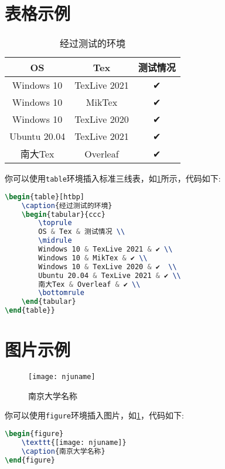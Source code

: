 \documentclass[
    TitleLength=1,%
    Degree=UG,%
    Type=thesis%
]{njuthesis}
\begin{document}
\section{表格示例}
\begin{table}[htbp]
    \caption{经过测试的环境}
    \label{tab:mytab}
    \begin{tabular}{ccc}
        \toprule
        OS & Tex & 测试情况 \\
        \midrule
        Windows 10 & TexLive 2021 & ✔ \\
        Windows 10 & MikTex & ✔ \\
        Windows 10 & TexLive 2020 & ✔  \\
        Ubuntu 20.04 & TexLive 2021 & ✔ \\
        南大Tex & Overleaf & ✔ \\
        \bottomrule
    \end{tabular}
\end{table}
你可以使用\lstinline|table|环境插入标准三线表，如\cref{tab:mytab}所示，代码如下:
\begin{lstlisting}[language=TeX]
\begin{table}[htbp]
    \caption{经过测试的环境}
    \begin{tabular}{ccc}
        \toprule
        OS & Tex & 测试情况 \\
        \midrule
        Windows 10 & TexLive 2021 & ✔ \\
        Windows 10 & MikTex & ✔ \\
        Windows 10 & TexLive 2020 & ✔  \\
        Ubuntu 20.04 & TexLive 2021 & ✔ \\
        南大Tex & Overleaf & ✔ \\
        \bottomrule
    \end{tabular}
\end{table}}
\end{lstlisting}

\section{图片示例}
\begin{figure}[htbp]
    \texttt{[image: njuname]}
    \caption{南京大学名称}
    \label{fig:njuname}
\end{figure}
你可以使用\lstinline|figure|环境插入图片，如\cref{fig:njuname}，代码如下:
\begin{lstlisting}[language=TeX]
\begin{figure}
    \texttt{[image: njuname]}
    \caption{南京大学名称}
\end{figure}
\end{lstlisting}
\end{document}
